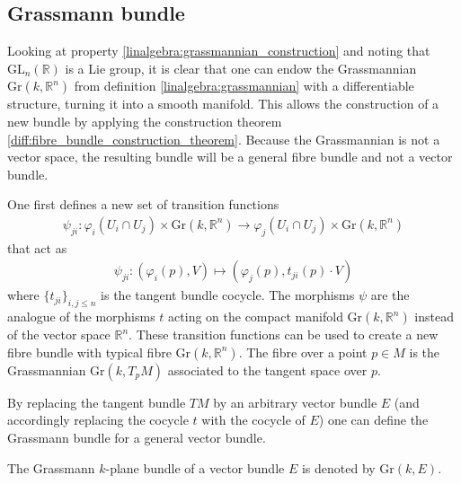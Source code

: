 \subsection{Grassmann bundle}

    Looking at property \ref{linalgebra:grassmannian_construction} and noting that $\text{GL}_n(\mathbb{R})$ is a Lie group, it is clear that one can endow the Grassmannian $\text{Gr}(k, \mathbb{R}^n)$ from definition \ref{linalgebra:grassmannian} with a differentiable structure, turning it into a smooth manifold. This allows the construction of a new bundle by applying the construction theorem \ref{diff:fibre_bundle_construction_theorem}. Because the Grassmannian is not a vector space, the resulting bundle will be a general fibre bundle and not a vector bundle.

    \begin{construct}\label{diff:grassmann_bundle}
        One first defines a new set of transition functions
        \begin{gather}
            \psi_{ji}:\varphi_i(U_i\cap U_j)\times \text{Gr}(k, \mathbb{R}^n) \rightarrow \varphi_j(U_i\cap U_j)\times \text{Gr}(k, \mathbb{R}^n)
        \end{gather}
        that act as
        \begin{gather}
            \psi_{ji}:(\varphi_i(p), V)\mapsto(\varphi_j(p), t_{ji}(p)\cdot V)
        \end{gather}
        where $\{t_{ji}\}_{i,j\leq n}$ is the tangent bundle cocycle. The morphisms $\psi$ are the analogue of the morphisms $t$ acting on the compact manifold $\text{Gr}(k, \mathbb{R}^n)$ instead of the vector space $\mathbb{R}^n$. These transition functions can be used to create a new fibre bundle with typical fibre $\text{Gr}(k, \mathbb{R}^n)$. The fibre over a point $p\in M$ is the Grassmannian $\text{Gr}(k, T_pM)$ associated to the tangent space over $p$.

        By replacing the tangent bundle $TM$ by an arbitrary vector bundle $E$ (and accordingly replacing the cocycle $t$ with the cocycle of $E$) one can define the Grassmann bundle for a general vector bundle.
    \end{construct}
    \begin{notation}
        The Grassmann $k$-plane bundle of a vector bundle $E$ is denoted by $\text{Gr}(k, E)$.
    \end{notation}


